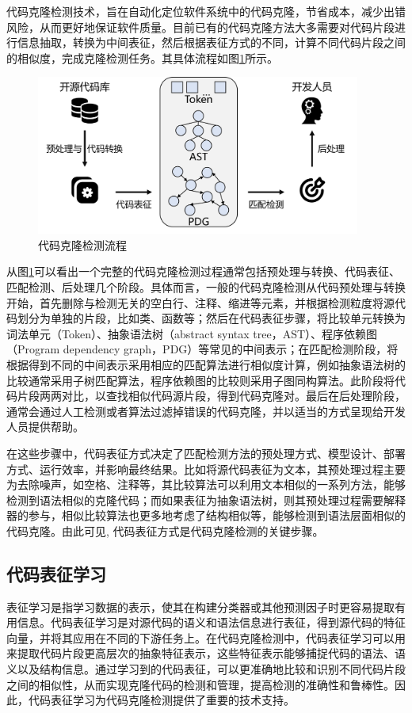 代码克隆检测技术，旨在自动化定位软件系统中的代码克隆，节省成本，减少出错风险，从而更好地保证软件质量。目前已有的代码克隆方法大多需要对代码片段进行信息抽取，转换为中间表征，然后根据表征方式的不同，计算不同代码片段之间的相似度，完成克隆检测任务。其具体流程如图\ref{fig:figure1}所示。
\begin{figure}[H]
    \centering
    \includegraphics[width=0.95\textwidth]{figures/figure1}
    \caption{代码克隆检测流程}\label{fig:figure1}
\end{figure}

从图\ref{fig:figure1}可以看出一个完整的代码克隆检测过程通常包括预处理与转换、代码表征、匹配检测、后处理几个阶段。具体而言，一般的代码克隆检测从代码预处理与转换开始，首先删除与检测无关的空白行、注释、缩进等元素，并根据检测粒度将源代码划分为单独的片段，比如类、函数等；然后在代码表征步骤，将比较单元转换为词法单元（Token）、抽象语法树（abstract syntax tree，AST）、程序依赖图（Program dependency graph，PDG）等常见的中间表示；在匹配检测阶段，将根据得到不同的中间表示采用相应的匹配算法进行相似度计算，例如抽象语法树的比较通常采用子树匹配算法，程序依赖图的比较则采用子图同构算法。此阶段将代码片段两两对比，以查找相似代码源片段，得到代码克隆对。最后在后处理阶段，通常会通过人工检测或者算法过滤掉错误的代码克隆，并以适当的方式呈现给开发人员提供帮助。

在这些步骤中，代码表征方式决定了匹配检测方法的预处理方式、模型设计、部署方式、运行效率，并影响最终结果\cite{陈秋远2019代码克隆检测研究进展}。比如将源代码表征为文本，其预处理过程主要为去除噪声，如空格、注释等，其比较算法可以利用文本相似的一系列方法，能够检测到语法相似的克隆代码；而如果表征为抽象语法树，则其预处理过程需要解释器的参与，相似比较算法也更多地考虑了结构相似等，能够检测到语法层面相似的代码克隆。由此可见, 代码表征方式是代码克隆检测的关键步骤。


\subsection{代码表征学习}
\label{subsec:Code representation}
表征学习是指学习数据的表示，使其在构建分类器或其他预测因子时更容易提取有用信息\cite{Bengio2013Representation}。代码表征学习是对源代码的语义和语法信息进行表征，得到源代码的特征向量，并将其应用在不同的下游任务上。在代码克隆检测中，代码表征学习可以用来提取代码片段更高层次的抽象特征表示，这些特征表示能够捕捉代码的语法、语义以及结构信息。通过学习到的代码表征，可以更准确地比较和识别不同代码片段之间的相似性，从而实现克隆代码的检测和管理，提高检测的准确性和鲁棒性。因此，代码表征学习为代码克隆检测提供了重要的技术支持。


